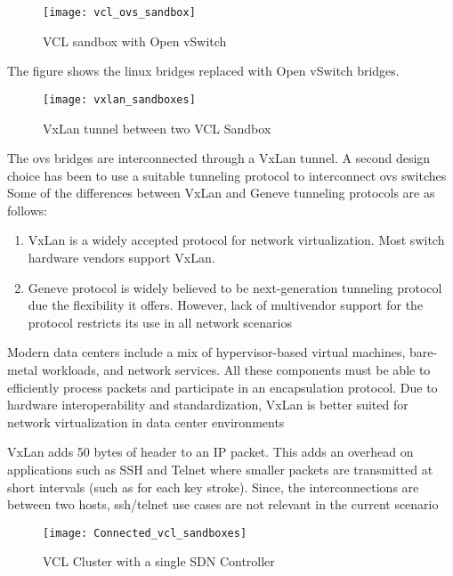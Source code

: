 \documentclass[12pt]{extarticle}
\begin{document}
\begin{figure}[H]
\centering
\texttt{[image: vcl\_ovs\_sandbox]}
\caption{VCL sandbox with Open vSwitch}
\label{fig:vclovs}
\end{figure}

The figure shows the linux bridges replaced with Open vSwitch bridges. 

\begin{figure}[H]
\centering
\texttt{[image: vxlan\_sandboxes]}
\caption{VxLan tunnel between two VCL Sandbox}
\label{fig:vlcvxlan}
\end{figure}

The ovs bridges are interconnected through a VxLan tunnel. A second design choice has been to use a suitable tunneling protocol to interconnect ovs switches
Some of the differences between VxLan and Geneve tunneling protocols are as follows:
\begin{enumerate}
    \item VxLan is a widely accepted protocol for network virtualization. Most switch hardware vendors support VxLan. 
    \item Geneve protocol is widely believed to be next-generation tunneling protocol due the flexibility it offers. However, lack of multivendor support for the protocol restricts its use in all network scenarios
    
\end{enumerate}
Modern data centers include a mix of hypervisor-based virtual machines, bare-metal workloads, and network services. All these components must be able to efficiently process packets and participate in an encapsulation protocol. Due to hardware interoperability and standardization, VxLan is better suited for network virtualization in data center environments

VxLan adds 50 bytes of header to an IP packet. This adds an overhead on applications such as SSH and Telnet where smaller packets are transmitted at short intervals (such as for each key stroke). Since, the interconnections are between two hosts, ssh/telnet use cases are not relevant in the current scenario

\begin{figure}[H]
\centering
\texttt{[image: Connected\_vcl\_sandboxes]}
\caption{VCL Cluster with a single SDN Controller}
\label{fig:vclconnected}
\end{figure}
\end{document}
